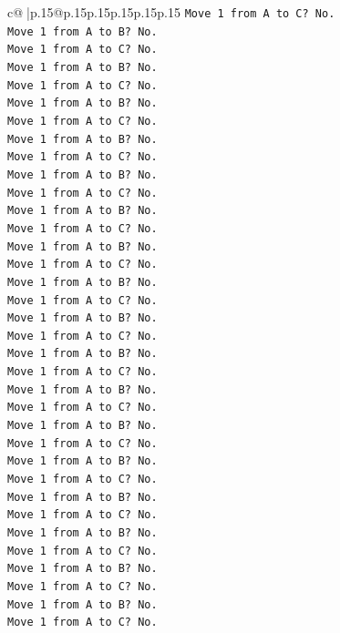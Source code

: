 \documentclass{article}
\begin{document}
{\begin{supertabular}{c@{$\;$}|p{.15\linewidth}@{}p{.15\linewidth}p{.15\linewidth}p{.15\linewidth}p{.15\linewidth}p{.15\linewidth}}
{{{\texttt{Move 1 from A to C? No.} \\
\texttt{Move 1 from A to B? No.} \\
\texttt{Move 1 from A to C? No.} \\
\texttt{Move 1 from A to B? No.} \\
\texttt{Move 1 from A to C? No.} \\
\texttt{Move 1 from A to B? No.} \\
\texttt{Move 1 from A to C? No.} \\
\texttt{Move 1 from A to B? No.} \\
\texttt{Move 1 from A to C? No.} \\
\texttt{Move 1 from A to B? No.} \\
\texttt{Move 1 from A to C? No.} \\
\texttt{Move 1 from A to B? No.} \\
\texttt{Move 1 from A to C? No.} \\
\texttt{Move 1 from A to B? No.} \\
\texttt{Move 1 from A to C? No.} \\
\texttt{Move 1 from A to B? No.} \\
\texttt{Move 1 from A to C? No.} \\
\texttt{Move 1 from A to B? No.} \\
\texttt{Move 1 from A to C? No.} \\
\texttt{Move 1 from A to B? No.} \\
\texttt{Move 1 from A to C? No.} \\
\texttt{Move 1 from A to B? No.} \\
\texttt{Move 1 from A to C? No.} \\
\texttt{Move 1 from A to B? No.} \\
\texttt{Move 1 from A to C? No.} \\
\texttt{Move 1 from A to B? No.} \\
\texttt{Move 1 from A to C? No.} \\
\texttt{Move 1 from A to B? No.} \\
\texttt{Move 1 from A to C? No.} \\
\texttt{Move 1 from A to B? No.} \\
\texttt{Move 1 from A to C? No.} \\
\texttt{Move 1 from A to B? No.} \\
\texttt{Move 1 from A to C? No.} \\
\texttt{Move 1 from A to B? No.} \\
\texttt{Move 1 from A to C? No.} \\
}}}
\end{supertabular}}
\end{document}
